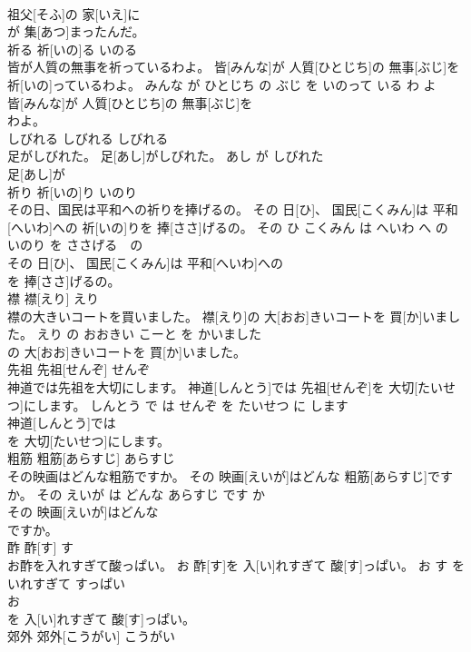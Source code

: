\documentclass[8pt]{extreport}
\begin{document}
\begin{CJK}{UTF8}{min}
\\	祖父[そふ]の 家[いえ]に
\\	が 集[あつ]まったんだ。			
\\	祈る	祈[いの]る	いのる	
\\	皆が人質の無事を祈っているわよ。	皆[みんな]が 人質[ひとじち]の 無事[ぶじ]を 祈[いの]っているわよ。	みんな が ひとじち の ぶじ を いのって いる わ よ	
\\	皆[みんな]が 人質[ひとじち]の 無事[ぶじ]を
\\	わよ。			
\\	しびれる	しびれる	しびれる	
\\	足がしびれた。	足[あし]がしびれた。	あし が しびれた	
\\	足[あし]が
\\	祈り	祈[いの]り	いのり	
\\	その日、国民は平和への祈りを捧げるの。	その 日[ひ]、 国民[こくみん]は 平和[へいわ]への 祈[いの]りを 捧[ささ]げるの。	その ひ こくみん は へいわ へ の いのり を ささげる　の	
\\	その 日[ひ]、 国民[こくみん]は 平和[へいわ]への
\\	を 捧[ささ]げるの。			
\\	襟	襟[えり]	えり	
\\	襟の大きいコートを買いました。	襟[えり]の 大[おお]きいコートを 買[か]いました。	えり の おおきい こーと を かいました	
\\	の 大[おお]きいコートを 買[か]いました。			
\\	先祖	先祖[せんぞ]	せんぞ	
\\	神道では先祖を大切にします。	神道[しんとう]では 先祖[せんぞ]を 大切[たいせつ]にします。	しんとう で は せんぞ を たいせつ に します	
\\	神道[しんとう]では
\\	を 大切[たいせつ]にします。			
\\	粗筋	粗筋[あらすじ]	あらすじ	
\\	その映画はどんな粗筋ですか。	その 映画[えいが]はどんな 粗筋[あらすじ]ですか。	その えいが は どんな あらすじ です か	
\\	その 映画[えいが]はどんな
\\	ですか。			
\\	酢	酢[す]	す	
\\	お酢を入れすぎて酸っぱい。	お 酢[す]を 入[い]れすぎて 酸[す]っぱい。	お す を いれすぎて すっぱい	
\\	お
\\	を 入[い]れすぎて 酸[す]っぱい。			
\\	郊外	郊外[こうがい]	こうがい	

\end{CJK}
\end{document}
